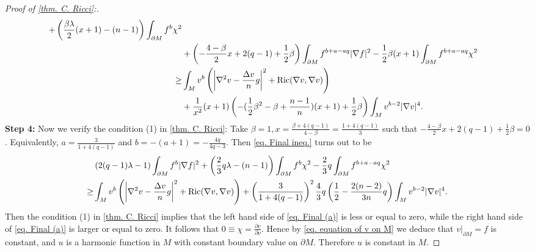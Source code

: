 \documentclass[12pt]{amsart}%
\numberwithin{equation}{section}
\numberwithin{lemma}{section}
\numberwithin{proposition}{section}
\numberwithin{corollary}{section}
\numberwithin{remark}{section}
\begin{document}
\begin{proof}[Proof of \cref{thm. C. Ricci}:]
\begin{align}
        +\left(\frac{\beta\lambda}{2}(x+1)-(n-1)\right)
        \int_{\partial M}f^b\chi^2\notag\\
        &+\left(-\frac{4-\beta}{2}x+2(q-1)+\frac{1}{2}\beta\right)
        \int_{\partial M}f^{b+a-aq}|\nabla f|^2\notag
        -\frac{1}{2}\beta(x+1)\int_{\partial M}f^{b+a-aq}\chi^2\\
        \geq & \int_M v^b\left(
        \left|\nabla^2 v-\frac{\Delta v}{n}g\right|^2
        +\mathrm{Ric}(\nabla v,\nabla v)
        \right)\notag\\
        &+\frac{1}{x^2}(x+1)\left(
        -(\frac{1}{2}\beta^2-\beta+\frac{n-1}{n})(x+1)+\frac{1}{2}\beta
        \right)
        \int_M v^{b-2}|\nabla v|^4.
    \end{align}
    \textbf{Step 4:} Now we verify the condition (1) in \cref{thm. C. Ricci}: Take $\beta=1, x=\frac{\beta+4(q-1)}{4-\beta}=\frac{1+4(q-1)}{3}$ such that $-\frac{4-\beta}{2}x+2(q-1)+\frac{1}{2}\beta=0$. Equivalently, $a=\frac{3}{1+4(q-1)}$ and $b=-(a+1)=-\frac{4q}{4q-3}$. Then \cref{eq. Final ineq.} turns out to be
    \begin{align}\label{eq. Final (a)}
        &\left(2(q-1)\lambda-1 \right)\int_{\partial M}f^b|\nabla f|^2
        +\left(\frac{2}{3}q\lambda-(n-1)\right)\int_{\partial M}f^b\chi^2
        -\frac{2}{3}q\int_{\partial M}f^{b+a-aq}\chi^2\notag\\
        \geq& \int_M v^b\left(
        \left|\nabla^2 v-\frac{\Delta v}{n}g\right|^2
        +\mathrm{Ric}(\nabla v,\nabla v)
        \right)
        +\left(\frac{3}{1+4(q-1)}\right)^2
        \frac{4}{3}q
        \left(\frac{1}{2}-\frac{2(n-2)}{3n}q\right)
        \int_M v^{b-2}|\nabla v|^4.
    \end{align}
    Then the condition (1) in \cref{thm. C. Ricci} implies that the left hand side of \cref{eq. Final (a)} is less or equal to zero, while the right hand side of \cref{eq. Final (a)} is larger or equal to zero. It follows that $0\equiv\chi=\frac{\partial v}{\partial \nu}$. Hence by \cref{eq. equation of v on M} we deduce that $v|_{\partial M}=f$ is constant, and $u$ is a harmonic function in $M$ with constant boundary value on $\partial M$. Therefore $u$ is constant in $M$.


\end{proof}
\end{document}
